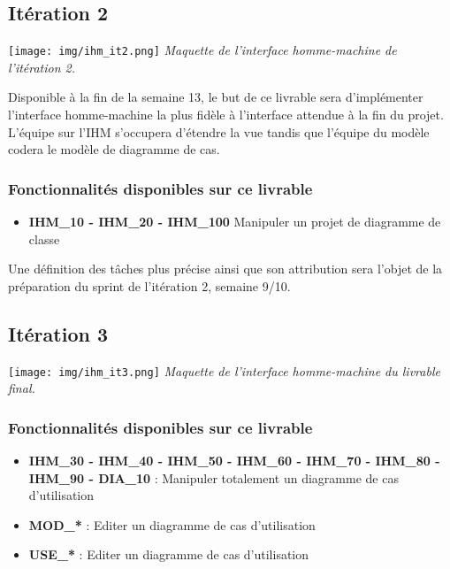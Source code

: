 \documentclass[hidelinks, 10pt,a4paper]{article}
\begin{document}
\subsection{Itération 2}
\begin{center}
  \texttt{[image: img/ihm\_it2.png]}
\textit{Maquette de l'interface homme-machine de l'itération 2.}
\end{center}

Disponible à la fin de la semaine 13, le but de ce livrable
sera d'implémenter l'interface homme-machine la plus fidèle à l'interface attendue à
la fin du projet. L'équipe sur l'IHM s'occupera d'étendre la vue tandis que l'équipe du 
modèle codera le modèle de diagramme de cas. 

\subsubsection{Fonctionnalités disponibles sur ce livrable}
\begin{itemize}
  \item \textbf{IHM\_10 - IHM\_20 - IHM\_100} Manipuler un projet de diagramme de classe
\end{itemize}

Une définition des tâches plus précise ainsi que son attribution sera l'objet de la
préparation du sprint de l'itération 2, semaine 9/10.

\subsection{Itération 3}
\begin{center}
  \texttt{[image: img/ihm\_it3.png]}
\textit{Maquette de l'interface homme-machine du livrable final.}
\end{center}

\subsubsection{Fonctionnalités disponibles sur ce livrable}
\begin{itemize}
  \item \textbf{IHM\_30 - IHM\_40 - IHM\_50 - IHM\_60 - IHM\_70 - IHM\_80 - IHM\_90 - DIA\_10} : Manipuler totalement un diagramme de cas d'utilisation
  \item \textbf{MOD\_*} : Editer un diagramme de cas d'utilisation
  \item \textbf{USE\_*} : Editer un diagramme de cas d'utilisation
\end{itemize}
\end{document}
